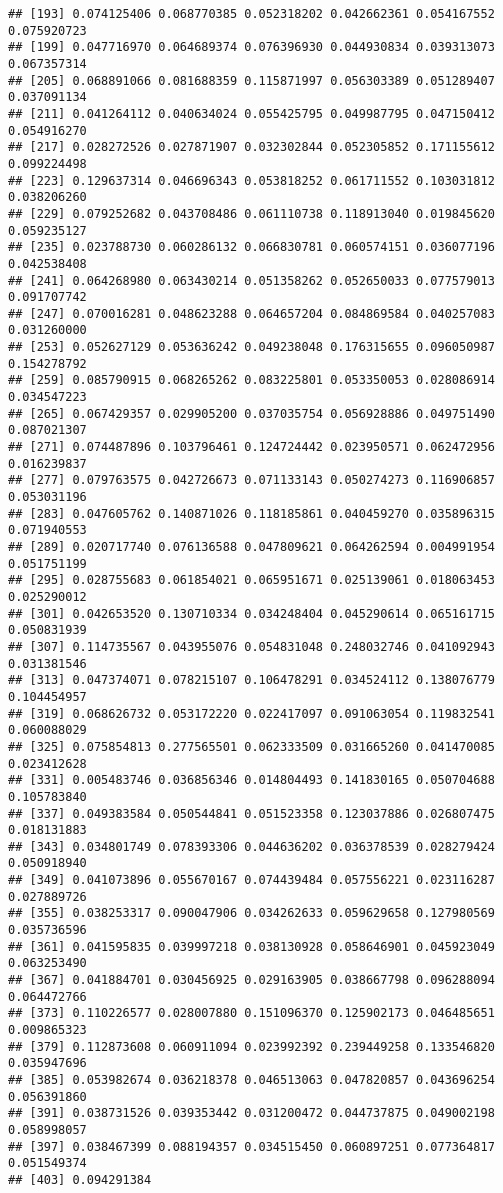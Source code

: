 \documentclass[
]{article}
\begin{document}
\begin{verbatim}
## [193] 0.074125406 0.068770385 0.052318202 0.042662361 0.054167552 0.075920723
## [199] 0.047716970 0.064689374 0.076396930 0.044930834 0.039313073 0.067357314
## [205] 0.068891066 0.081688359 0.115871997 0.056303389 0.051289407 0.037091134
## [211] 0.041264112 0.040634024 0.055425795 0.049987795 0.047150412 0.054916270
## [217] 0.028272526 0.027871907 0.032302844 0.052305852 0.171155612 0.099224498
## [223] 0.129637314 0.046696343 0.053818252 0.061711552 0.103031812 0.038206260
## [229] 0.079252682 0.043708486 0.061110738 0.118913040 0.019845620 0.059235127
## [235] 0.023788730 0.060286132 0.066830781 0.060574151 0.036077196 0.042538408
## [241] 0.064268980 0.063430214 0.051358262 0.052650033 0.077579013 0.091707742
## [247] 0.070016281 0.048623288 0.064657204 0.084869584 0.040257083 0.031260000
## [253] 0.052627129 0.053636242 0.049238048 0.176315655 0.096050987 0.154278792
## [259] 0.085790915 0.068265262 0.083225801 0.053350053 0.028086914 0.034547223
## [265] 0.067429357 0.029905200 0.037035754 0.056928886 0.049751490 0.087021307
## [271] 0.074487896 0.103796461 0.124724442 0.023950571 0.062472956 0.016239837
## [277] 0.079763575 0.042726673 0.071133143 0.050274273 0.116906857 0.053031196
## [283] 0.047605762 0.140871026 0.118185861 0.040459270 0.035896315 0.071940553
## [289] 0.020717740 0.076136588 0.047809621 0.064262594 0.004991954 0.051751199
## [295] 0.028755683 0.061854021 0.065951671 0.025139061 0.018063453 0.025290012
## [301] 0.042653520 0.130710334 0.034248404 0.045290614 0.065161715 0.050831939
## [307] 0.114735567 0.043955076 0.054831048 0.248032746 0.041092943 0.031381546
## [313] 0.047374071 0.078215107 0.106478291 0.034524112 0.138076779 0.104454957
## [319] 0.068626732 0.053172220 0.022417097 0.091063054 0.119832541 0.060088029
## [325] 0.075854813 0.277565501 0.062333509 0.031665260 0.041470085 0.023412628
## [331] 0.005483746 0.036856346 0.014804493 0.141830165 0.050704688 0.105783840
## [337] 0.049383584 0.050544841 0.051523358 0.123037886 0.026807475 0.018131883
## [343] 0.034801749 0.078393306 0.044636202 0.036378539 0.028279424 0.050918940
## [349] 0.041073896 0.055670167 0.074439484 0.057556221 0.023116287 0.027889726
## [355] 0.038253317 0.090047906 0.034262633 0.059629658 0.127980569 0.035736596
## [361] 0.041595835 0.039997218 0.038130928 0.058646901 0.045923049 0.063253490
## [367] 0.041884701 0.030456925 0.029163905 0.038667798 0.096288094 0.064472766
## [373] 0.110226577 0.028007880 0.151096370 0.125902173 0.046485651 0.009865323
## [379] 0.112873608 0.060911094 0.023992392 0.239449258 0.133546820 0.035947696
## [385] 0.053982674 0.036218378 0.046513063 0.047820857 0.043696254 0.056391860
## [391] 0.038731526 0.039353442 0.031200472 0.044737875 0.049002198 0.058998057
## [397] 0.038467399 0.088194357 0.034515450 0.060897251 0.077364817 0.051549374
## [403] 0.094291384
\end{verbatim}
\end{document}

